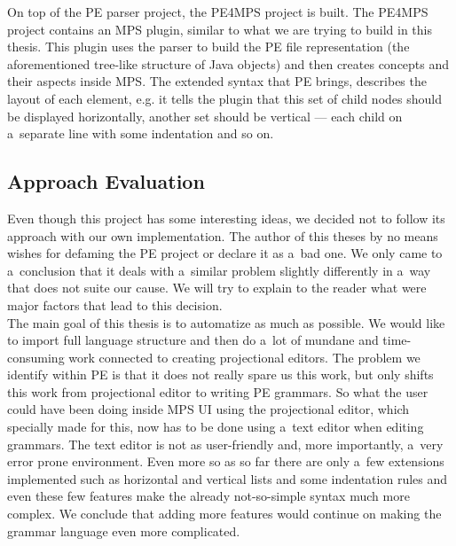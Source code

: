 On top of the PE parser project, the PE4MPS project is built.
The PE4MPS project contains an MPS plugin, similar to what we are trying to build in this thesis.
This plugin uses the parser to build the PE file representation (the aforementioned tree-like structure of Java objects) and then creates concepts and their aspects inside MPS.
The extended syntax that PE brings, describes the layout of each element, e.g. it tells the plugin that this set of child nodes should be displayed horizontally, another set should be vertical --- each child on a~separate line with some indentation and so on.

\subsection{Approach Evaluation}
Even though this project has some interesting ideas, we decided not to follow its approach with our own implementation.
The author of this theses by no means wishes for defaming the PE project or declare it as a~bad one.
We only came to a~conclusion that it deals with a~similar problem slightly differently in a~way that does not suite our cause.
We will try to explain to the reader what were major factors that lead to this decision.
\\

The main goal of this thesis is to automatize as much as possible.
We would like to import full language structure and then do a~lot of mundane and time-consuming work connected to creating projectional editors.
The problem we identify within PE is that it does not really spare us this work, but only shifts this work from projectional editor to writing PE grammars.
So what the user could have been doing inside MPS UI using the projectional editor, which specially made for this, now has to be done using a~text editor when editing grammars.
The text editor is not as user-friendly and, more importantly, a~very error prone environment.
Even more so as so far there are only a~few extensions implemented such as horizontal and vertical lists and some indentation rules and even these few features make the already not-so-simple syntax much more complex.
We conclude that adding more features would continue on making the grammar language even more complicated.
\\

